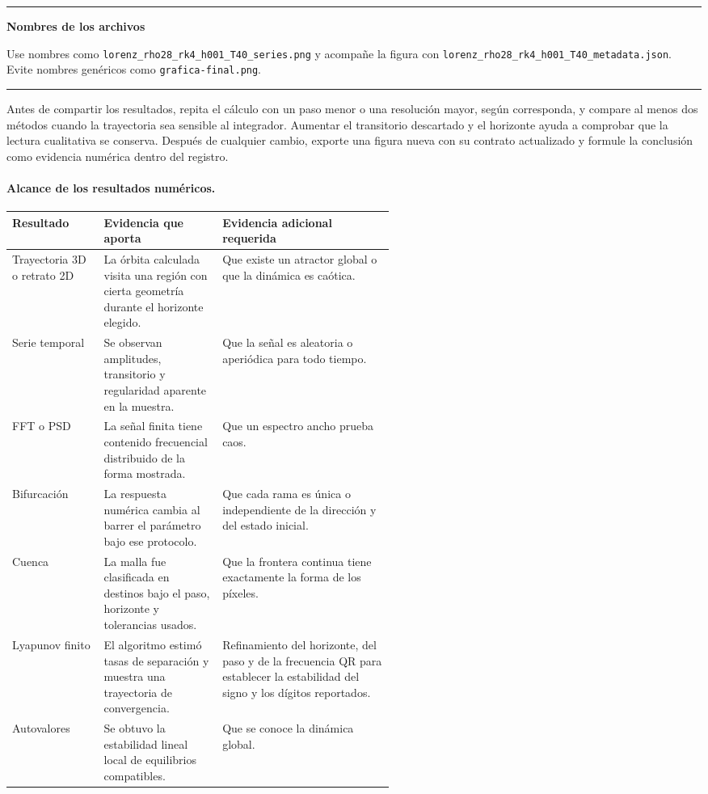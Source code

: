 \documentclass[11pt]{article}
\newcommand{\archivo}[1]{\nolinkurl{#1}}
\newenvironment{cajaverde}[1]
{\begin{center}\begin{minipage}{0.93\linewidth}\color{GrisTexto}
\textcolor{Turquesa}{\rule{\linewidth}{0.8pt}}\par\smallskip
\textcolor{Turquesa}{\bfseries #1}\par\smallskip}
{\par\smallskip\textcolor{Turquesa}{\rule{\linewidth}{0.8pt}}\end{minipage}\end{center}}
\begin{document}
\begin{cajaverde}{Nombres de los archivos}
Use nombres como \archivo{lorenz_rho28_rk4_h001_T40_series.png} y acompañe la figura con \archivo{lorenz_rho28_rk4_h001_T40_metadata.json}. Evite nombres genéricos como \archivo{grafica-final.png}.
\end{cajaverde}

Antes de compartir los resultados, repita el cálculo con un paso menor o una resolución mayor, según corresponda, y compare al menos dos métodos cuando la trayectoria sea sensible al integrador. Aumentar el transitorio descartado y el horizonte ayuda a comprobar que la lectura cualitativa se conserva. Después de cualquier cambio, exporte una figura nueva con su contrato actualizado y formule la conclusión como evidencia numérica dentro del registro.

\paragraph{Alcance de los resultados numéricos.}

\begin{tabularx}{\linewidth}{>{\raggedright\arraybackslash}p{0.24\linewidth}>{\raggedright\arraybackslash}p{0.31\linewidth}X}
\toprule
Resultado & Evidencia que aporta & Evidencia adicional requerida \\
\midrule
Trayectoria 3D o retrato 2D & La órbita calculada visita una región con cierta geometría durante el horizonte elegido. & Que existe un atractor global o que la dinámica es caótica. \\
Serie temporal & Se observan amplitudes, transitorio y regularidad aparente en la muestra. & Que la señal es aleatoria o aperiódica para todo tiempo. \\
FFT o PSD & La señal finita tiene contenido frecuencial distribuido de la forma mostrada. & Que un espectro ancho prueba caos. \\
Bifurcación & La respuesta numérica cambia al barrer el parámetro bajo ese protocolo. & Que cada rama es única o independiente de la dirección y del estado inicial. \\
Cuenca & La malla fue clasificada en destinos bajo el paso, horizonte y tolerancias usados. & Que la frontera continua tiene exactamente la forma de los píxeles. \\
Lyapunov finito & El algoritmo estimó tasas de separación y muestra una trayectoria de convergencia. & Refinamiento del horizonte, del paso y de la frecuencia QR para establecer la estabilidad del signo y los dígitos reportados. \\
Autovalores & Se obtuvo la estabilidad lineal local de equilibrios compatibles. & Que se conoce la dinámica global. \\
\bottomrule
\end{tabularx}
\end{document}

